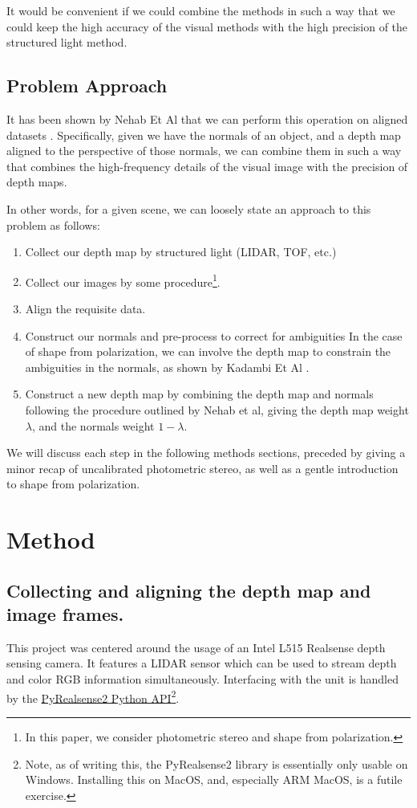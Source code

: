 \documentclass[final]{cvpr}
\begin{document}
It would be convenient if we could combine the methods in such a way that we could keep the high accuracy of the visual methods with the high precision of the structured light method. 

\subsection{Problem Approach}

It has been shown by Nehab Et Al that we can perform this operation on aligned datasets \cite{NehabSource}. Specifically, given we have the normals of an object, and a depth map aligned to the perspective of those normals, we can combine them in such a way that combines the high-frequency details of the visual image with the precision of depth maps. 

In other words, for a given scene, we can loosely state an approach to this problem as follows: 
\begin{enumerate}
	\item Collect our depth map by structured light (LIDAR, TOF, etc.)
	\item Collect our images by some procedure\footnote{In this paper, we consider photometric stereo and shape from polarization.}.
	\item Align the requisite data.
	\item Construct our normals and pre-process to correct for ambiguities
	\subitem In the case of shape from polarization, we can involve the depth map to constrain the ambiguities in the normals, as shown by Kadambi Et Al \cite{Kadambi2017}.  
	\item Construct a new depth map by combining the depth map and normals following the procedure outlined by Nehab et al, giving the depth map weight $\lambda$, and the normals weight $1 - \lambda$.
\end{enumerate}
We will discuss each step in the following methods sections, preceded by giving a minor recap of uncalibrated photometric stereo, as well as a gentle introduction to shape from polarization. 

\section{Method}
\subsection{Collecting and aligning the depth map and image frames.}
This project was centered around the usage of an Intel L515 Realsense depth sensing camera. It features a LIDAR sensor which can be used to stream depth and color RGB information simultaneously. Interfacing with the unit is handled by the \href{https://intelrealsense.github.io/librealsense/python_docs/_generated/pyrealsense2.html}{PyRealsense2 Python API}\footnote{Note, as of writing this, the PyRealsense2 library is essentially only usable on Windows. Installing this on MacOS, and, especially ARM MacOS, is a futile exercise.}.
\end{document}
